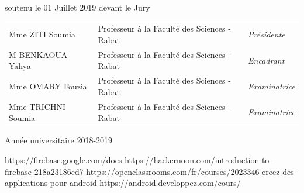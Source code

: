 \documentclass[50pt]{report}
\numberwithin{equation}{section} %
\numberwithin{figure}{section} %
\begin{document}
\begin{titlepage}
\begin{center}
\vspace*{0.2cm}
\noindent \large soutenu le 01 Juillet 2019 devant le Jury\\
\vspace*{0.5cm}
\end{center}


\noindent \large
\begin{tabular}{lll}

Mme ZITI  Soumia  &  Professeur à la Faculté des Sciences - Rabat   & \textit{Présidente} \\
M BENKAOUA  Yahya   &  Professeur à la Faculté des Sciences - Rabat & \textit{Encadrant}	\\
Mme OMARY  Fouzia   &  Professeur à la Faculté des Sciences - Rabat & \textit{Examinatrice}  \\
Mme TRICHNI  Soumia    &  Professeur à la Faculté des Sciences - Rabat & \textit{Examinatrice}


\end{tabular}

\vfill
\begin{center}
Année universitaire 2018-2019
\end{center}
\end{titlepage}
\sloppy

\titlepage

\newpage


\newpage


\newpage



\begin{large}
\tableofcontents
\end{large}

\newpage

\listoffigures




\newpage



\newpage



\newpage



\newpage



\newpage



\newpage

\begin{thebibliography}{10} %

https://firebase.google.com/docs
https://hackernoon.com/introduction-to-firebase-218a23186cd7
https://openclassrooms.com/fr/courses/2023346-creez-des-applications-pour-android
https://android.developpez.com/cours/

\end{thebibliography}
\end{document}
